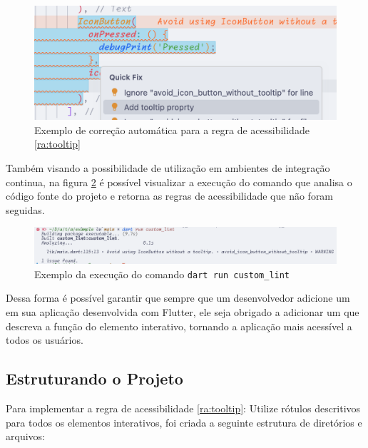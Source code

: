 \begin{figure}[!ht]
	\centering
	\caption{Exemplo de correção automática para a regra de acessibilidade \ref{ra:tooltip}}\label{fig:exemplo-correcao-automatica-tooltip}
	\includegraphics[width=425pt]{Assets/PrintIDECorrecao.png}
\end{figure}

Também visando a possibilidade de utilização em ambientes de integração continua, na figura \ref{fig:exmplo-comando-erro} é possível visualizar a execução do comando  que analisa o código fonte do projeto e retorna as regras de acessibilidade que não foram seguidas.

\begin{figure}[!ht]
	\centering
	\caption{Exemplo da execução do comando \texttt{dart run custom\_lint}}\label{fig:exmplo-comando-erro}
	\includegraphics[width=425pt]{Assets/PrintComandoCustomLint.png}
\end{figure}

Dessa forma é possível garantir que sempre que um desenvolvedor adicione um  em sua aplicação desenvolvida com Flutter, ele seja obrigado a adicionar um  que descreva a função do elemento interativo, tornando a aplicação mais acessível a todos os usuários.

\subsection{Estruturando o Projeto}

Para implementar a regra de acessibilidade \ref{ra:tooltip}: Utilize rótulos descritivos para todos os elementos interativos, foi criada a seguinte estrutura de diretórios e arquivos:

